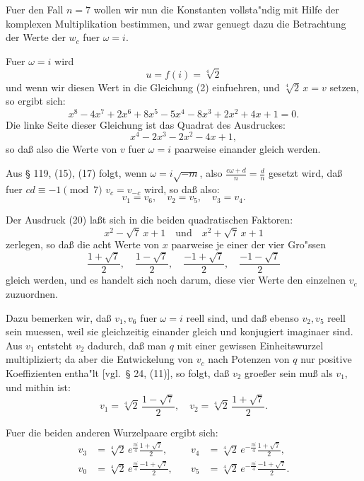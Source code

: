 \documentclass[12pt,a4paper]{article}
\theoremstyle{plain}
\theoremstyle{definition}
\theoremstyle{remark}
\begin{document}
Fuer den Fall $n = 7$ wollen wir nun die Konstanten vollsta"ndig mit Hilfe der komplexen Multiplikation bestimmen, und zwar genuegt dazu die Betrachtung der Werte der $w_c$ fuer $\omega = i$.

Fuer $\omega = i$ wird
\[
u = f(i) = \sqrt[4]{2}
\]
und wenn wir diesen Wert in die Gleichung (2) einfuehren, und $\sqrt[4]{2}\, x = v$ setzen, so ergibt sich:
\begin{equation}\label{eq:133_19}
x^8 - 4x^7 + 2x^6 + 8x^5 - 5x^4 - 8x^3 + 2x^2 + 4x + 1 = 0.
\end{equation}
Die linke Seite dieser Gleichung ist das Quadrat des Ausdruckes:
\begin{equation}\label{eq:133_20}
x^4 - 2x^3 - 2x^2 - 4x + 1,
\end{equation}
so da\ss{} also die Werte von $v$ fuer $\omega = i$ paarweise einander gleich werden.

Aus \S{} 119, (15), (17) folgt, wenn $\omega = i\sqrt{-m}$, also $\frac{c\omega + d}{n} = \frac{d}{n}$ gesetzt wird, da\ss{} fuer $cd \equiv -1 \pmod{7}$ $v_c = v_{-c}$ wird, so da\ss{} also:
\begin{equation}\label{eq:133_21}
v_1 = v_6, \quad v_2 = v_5, \quad v_3 = v_4.
\end{equation}

Der Ausdruck (20) la\ss{}t sich in die beiden quadratischen Faktoren:
\[
x^2 - \sqrt{7}\, x + 1 \quad \text{und} \quad x^2 + \sqrt{7}\, x + 1
\]
zerlegen, so da\ss{} die acht Werte von $x$ paarweise je einer der vier Gro"ssen
\begin{equation}\label{eq:133_22}
\frac{1 + \sqrt{7}}{2}, \quad \frac{1 - \sqrt{7}}{2}, \quad \frac{-1 + \sqrt{7}}{2}, \quad \frac{-1 - \sqrt{7}}{2}
\end{equation}
gleich werden, und es handelt sich noch darum, diese vier Werte den einzelnen $v_c$ zuzuordnen.

Dazu bemerken wir, da\ss{} $v_1, v_6$ fuer $\omega = i$ reell sind, und da\ss{} ebenso $v_2, v_5$ reell sein muessen, weil sie gleichzeitig einander gleich und konjugiert imaginaer sind. Aus $v_1$ entsteht $v_2$ dadurch, da\ss{} man $q$ mit einer gewissen Einheitswurzel multipliziert; da aber die Entwickelung von $v_c$ nach Potenzen von $q$ nur positive Koeffizienten entha"lt [vgl.\ \S{} 24, (11)], so folgt, da\ss{} $v_2$ groe\ss{}er sein mu\ss{} als $v_1$, und mithin ist:
\[
v_1 = \sqrt[4]{2}\, \frac{1 - \sqrt{7}}{2}, \quad v_2 = \sqrt[4]{2}\, \frac{1 + \sqrt{7}}{2}.
\]

Fuer die beiden anderen Wurzelpaare ergibt sich:
\begin{equation}\label{eq:133_24}
\begin{aligned}
v_3 &= \sqrt[4]{2}\, e^{\frac{\pi i}{4}} \frac{1 + \sqrt{7}}{2}, \quad & v_4 &= \sqrt[4]{2}\, e^{-\frac{\pi i}{4}} \frac{1 + \sqrt{7}}{2}, \\
v_0 &= \sqrt[4]{2}\, e^{\frac{\pi i}{4}} \frac{-1 + \sqrt{7}}{2}, \quad & v_5 &= \sqrt[4]{2}\, e^{-\frac{\pi i}{4}} \frac{-1 + \sqrt{7}}{2}.
\end{aligned}
\end{equation}
\end{document}

